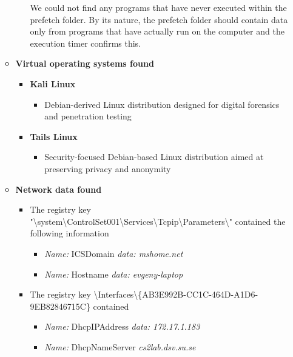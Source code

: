 \begin{enumerate}
\begin{itemize}
\begin{itemize}
			We could not find any programs that have never executed within the prefetch folder. By its nature, the prefetch folder should contain data only from programs that have actually run on the computer and the execution timer confirms this.
	\end{itemize}

	\item \textbf{Virtual operating systems found}
	\begin{itemize}
		\item \textbf{Kali Linux}
		\begin{itemize}
			\item Debian-derived Linux distribution designed for digital forensics and penetration testing
		\end{itemize}
		
		\item \textbf{Tails Linux}
		\begin{itemize}
			\item Security-focused Debian-based Linux distribution aimed at preserving privacy and anonymity
		\end{itemize}
	\end{itemize}
	

	\item \textbf{Network data found}
	
	\begin{itemize}
	
	\item The registry key "\textbackslash system\textbackslash ControlSet001\textbackslash Services\textbackslash Tcpip\textbackslash Parameters\textbackslash" contained the following information
	\begin{itemize}
		\item \textit{Name:} ICSDomain  \textit{data: mshome.net}
		\item \textit{Name:} Hostname  \textit{data: evgeny-laptop}
		
	\end{itemize}
	
	\item The registry key \textbackslash Interfaces\textbackslash \{AB3E992B-CC1C-464D-A1D6-9EB82846715C\} contained
	
	\begin{itemize}
		\item \textit{Name:} DhcpIPAddress  \textit{data: 172.17.1.183}
		\item \textit{Name:} DhcpNameServer  \textit{cs2lab.dsv.su.se}
	\end{itemize}
	

\end{itemize}
\end{itemize}
\end{enumerate}
